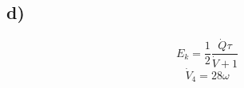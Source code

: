 

\subsection*{d)}
\[
E_k = \frac{1}{2} \frac{\dot{Q} \tau}{\dot{V} + 1}
\]
\[
\dot{V}_4 = 28 \omega
\]